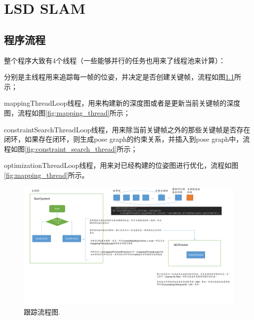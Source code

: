 

\chapter{LSD SLAM}
\section{程序流程}

整个程序大致有4个线程（一些能够并行的任务也用来了线程池来计算）：

分别是主线程用来追踪每一帧的位姿，并决定是否创建关键帧，流程如图\ref{fig:tracking}所示；

mappingThreadLoop线程，用来构建新的深度图或者是更新当前关键帧的深度图，流程如图\ref{fig:mapping_thread}所示；

constraintSearchThreadLoop线程，用来除当前关键帧之外的那些关键帧是否存在闭环，如果存在闭环，则生成pose graph的约束关系，并插入到pose graph中，流程如图\ref{fig:constraint_search_thread}所示；

optimizationThreadLoop线程，用来对已经构建的位姿图进行优化，流程如图\ref{fig:mapping_thread}所示。


\begin{figure}[h]%
	\centering  %
	\includegraphics[width=1.0\linewidth]{image/LSD-SLAM/LSD-SLAM-tracking.pdf}  %
	\caption{跟踪流程图.}  %
	\label{fig:tracking}   %
\end{figure}





